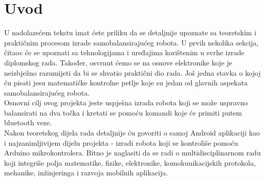 \documentclass[../Document.tex]{subfiles}
\begin{document}
\section{Uvod}

U nadolazećem tekstu imat ćete priliku da se detaljnije upoznate sa teoretskim i praktičnim procesom izrade samobalansirajućeg robota. U prvih nekolika sekcija, čitaoc će se upoznati sa tehnologijama i uređajima korištenim u svrhe izrade diplomskog rada. Također, osvrnut ćemo se na osnove elektronike koje je neizbježno razumijeti da bi se shvatio praktični dio rada. Još jedna stavka o kojoj ću pisati jesu matematičke kontrolne petlje koje su jedan od glavnih aspekata samobalansirajućeg robota.\\

\noindent Osnovni cilj ovog projekta jeste uspješna izrada robota koji se može uspravno balansirati na dva točka i kretati se pomoću komandi koje će primiti putem bluetooth veze.\\

\noindent Nakon teoretskog dijela rada detaljnije ću govoriti o samoj Android aplikaciji kao i najzanimljivijem dijelu projekta - izradi robota koji se kontroliše pomoću Arduino mikrokontrolera. Bitno je naglasiti da se radi o multidisciplinarnom radu koji integriše polja matematike, fizike, elektronike, komokunikacijskih protokola, mehanike, inžinjeringa i razvoja mobilnih aplikacija.
\end{document}
